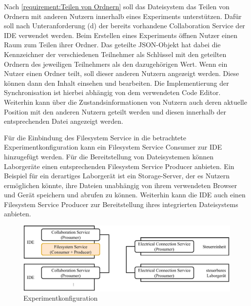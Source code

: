 Nach \autoref{requirement:Teilen von Ordnern} soll das Dateisystem das Teilen von Ordnern mit anderen Nutzern innerhalb eines Experiments unterstützen. Dafür soll nach Unteranforderung (d) der bereits vorhandene Collaboration Service der IDE verwendet werden. Beim Erstellen eines Experiments öffnen Nutzer einen Raum zum Teilen ihrer Ordner. Das geteilte JSON-Objekt hat dabei die Kennzeichner der verschiedenen Teilnehmer als Schlüssel mit den geteilten Ordnern des jeweiligen Teilnehmers als den dazugehörigen Wert. Wenn ein Nutzer einen Ordner teilt, soll dieser anderen Nutzern angezeigt werden. Diese können dann den Inhalt einsehen und bearbeiten. Die Implementierung der Synchronisation ist hierbei abhängig von dem verwendeten Code Editor. Weiterhin kann über die Zustandsinformationen von Nutzern auch deren aktuelle Position mit den anderen Nutzern geteilt werden und diesen innerhalb der entsprechenden Datei angezeigt werden.

Für die Einbindung des Filesystem Service in die betrachtete Experimentkonfiguration kann ein Filesystem Service Consumer zur IDE hinzugefügt werden. Für die Bereitstellung von Dateisystemen können Laborgeräte einen entsprechenden Filesystem Service Producer anbieten. Ein Beispiel für ein derartiges Laborgerät ist ein Storage-Server, der es Nutzern ermöglichen könnte, ihre Dateien unabhängig von ihrem verwendeten Browser und Gerät speichern und abrufen zu können. Weiterhin kann die IDE auch einen Filesystem Service Producer zur Bereitstellung ihres integrierten Dateisystems anbieten.

\begin{figure}[htbp]
    \centering
    \includegraphics[width=\textwidth]{diagrams/experimentkonfigurationen/Experimentkonfiguration-02.drawio.pdf}
    \caption{Experimentkonfiguration}
    \label{figure:experimentkonfiguration:dateisystem}
\end{figure}